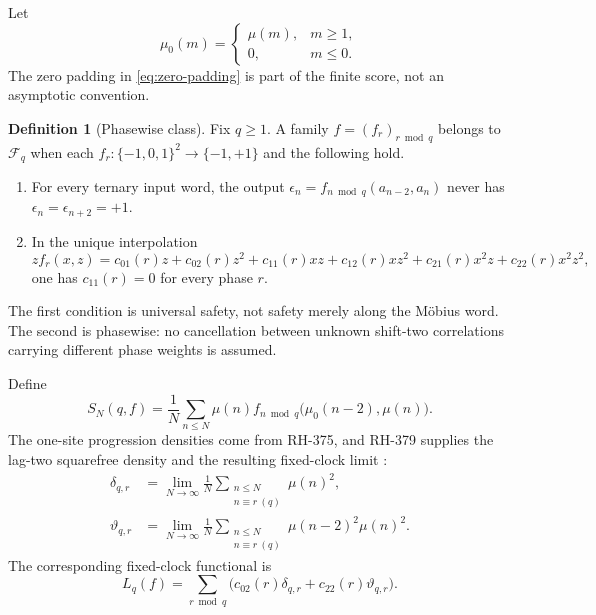 \documentclass[11pt]{article}
\theoremstyle{definition}
\newtheorem{definition}[theorem]{Definition}
\theoremstyle{remark}
\newcommand{\mob}{\mu}
\newcommand{\TT}{\{-1,0,1\}}
\newcommand{\Fcal}{\mathcal F}
\newcommand{\dd}{\delta}
\newcommand{\thh}{\vartheta}
\begin{document}
Let
\begin{equation}
 \mob_0(m)=
 \begin{cases}
  \mob(m),&m\ge1,\\
  0,&m\le0.
 \end{cases}
 \label{eq:zero-padding}
\end{equation}
The zero padding in \eqref{eq:zero-padding} is part of the finite score,
not an asymptotic convention.

\begin{definition}[Phasewise class]
Fix $q\ge1$.  A family $f=(f_r)_{r\bmod q}$ belongs to $\Fcal_q$ when
each $f_r:\TT^2\to\{-1,+1\}$ and the following hold.
\begin{enumerate}[leftmargin=2em]
 \item For every ternary input word, the output
 $\epsilon_n=f_{n\bmod q}(a_{n-2},a_n)$ never has
 $\epsilon_n=\epsilon_{n+2}=+1$.
 \item In the unique interpolation
 \begin{equation}
 zf_r(x,z)=c_{01}(r)z+c_{02}(r)z^2+c_{11}(r)xz
 +c_{12}(r)xz^2+c_{21}(r)x^2z+c_{22}(r)x^2z^2,
 \label{eq:interpolation}
 \end{equation}
 one has $c_{11}(r)=0$ for every phase $r$.
\end{enumerate}
\end{definition}

The first condition is universal safety, not safety merely along the
M\"obius word.  The second is phasewise: no cancellation between unknown
shift-two correlations carrying different phase weights is assumed.

Define
\begin{equation}
 S_N(q,f)=\frac1N\sum_{n\le N}\mob(n)
 f_{n\bmod q}\bigl(\mob_0(n-2),\mob(n)\bigr).
 \label{eq:finite-score}
\end{equation}
The one-site progression densities come from RH-375, and RH-379 supplies
the lag-two squarefree density and the resulting fixed-clock limit
\cite{RH375,RH379}:
\begin{align}
 \dd_{q,r}&=\lim_{N\to\infty}\frac1N
  \sum_{\substack{n\le N\\n\equiv r\ (q)}}\mob(n)^2,
 \label{eq:delta}\\
 \thh_{q,r}&=\lim_{N\to\infty}\frac1N
  \sum_{\substack{n\le N\\n\equiv r\ (q)}}
       \mob(n-2)^2\mob(n)^2.
 \label{eq:theta}
\end{align}
The corresponding fixed-clock functional is
\begin{equation}
 L_q(f)=\sum_{r\bmod q}
       \bigl(c_{02}(r)\dd_{q,r}+c_{22}(r)\thh_{q,r}\bigr).
 \label{eq:fixed-limit}
\end{equation}
\end{document}
